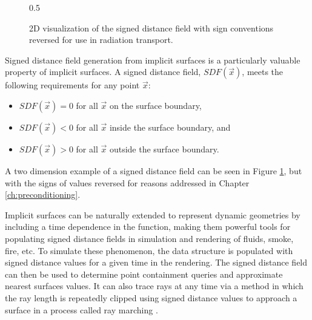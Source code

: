 \begin{figure}[H]
  {0.5\textwidth}
  \centering
  \caption{2D visualization of the signed distance field with sign conventions
    reversed for use in radiation transport.}
  \label{fig:preconditioner_datastruct}
\end{figure}





Signed distance field generation from implicit surfaces is a
particularly valuable property of implicit surfaces. A signed distance
field, $SDF(\vec{x})$, meets the following requirements
for any point $\vec{x}$:

\begin{itemize}
\item $ SDF(\vec{x}) = 0 $ for all $ \vec{x} $ on the surface boundary,
\item $ SDF(\vec{x}) < 0 $ for all $\vec{x}$ inside the surface boundary, and
\item $ SDF(\vec{x}) > 0 $ for all $\vec{x}$ outside the surface boundary.
\end{itemize}

A two dimension example of a signed distance field can be seen in Figure
\ref{fig:preconditioner_datastruct}, but with the signs of values reversed for
reasons addressed in Chapter \ref{ch:preconditioning}.

Implicit surfaces can be naturally extended to represent dynamic geometries by
including a time dependence in the function, making them powerful tools for
populating signed distance fields in simulation and rendering of fluids, smoke,
fire, etc. To simulate these phenomenon, the data structure is populated with
signed distance values for a given time in the rendering. The signed distance
field can then be used to determine point containment queries and approximate
nearest surfaces values. It can also trace rays at any time via a method in
which the ray length is repeatedly clipped using signed distance values to
approach a surface in a process called ray marching \cite{Tomczak_2012}.

